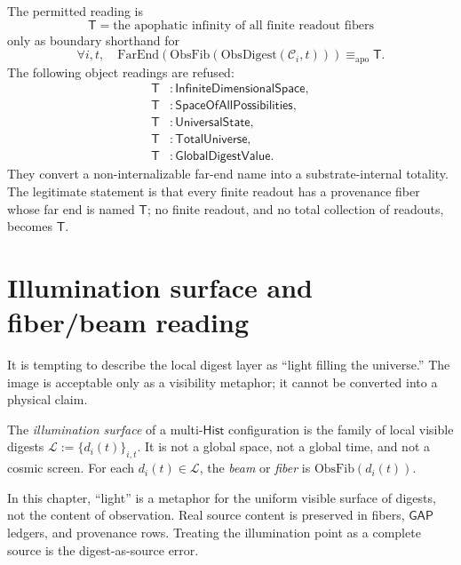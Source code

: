 \begin{principle}
\label{prin:hash-like-infinity-without-totality}
The permitted reading is
$$
\mathsf{T}=\text{the apophatic infinity of all finite readout fibers}
$$
only as boundary shorthand for
$$
\forall i,t,\quad
\mathrm{FarEnd}(\mathrm{ObsFib}(\mathrm{ObsDigest}(\mathcal{C}_i,t)))
\equiv_{\mathrm{apo}} \mathsf{T}.
$$
The following object readings are refused:
$$
\begin{aligned}
\mathsf{T} &: \mathsf{InfiniteDimensionalSpace},\\
\mathsf{T} &: \mathsf{SpaceOfAllPossibilities},\\
\mathsf{T} &: \mathsf{UniversalState},\\
\mathsf{T} &: \mathsf{TotalUniverse},\\
\mathsf{T} &: \mathsf{GlobalDigestValue}.
\end{aligned}
$$
They convert a non-internalizable far-end name into a substrate-internal totality. The legitimate statement is that every finite readout has a provenance fiber whose far end is named $\mathsf{T}$; no finite readout, and no total collection of readouts, becomes $\mathsf{T}$.
\end{principle}

\section{Illumination surface and fiber/beam reading}
\label{sec:hash-like-illumination-surface}

It is tempting to describe the local digest layer as ``light filling the universe.'' The image is acceptable only as a visibility metaphor; it cannot be converted into a physical claim.

\begin{definition}
\label{def:hash-like-illumination-surface}
The \emph{illumination surface} of a multi-$\mathsf{Hist}$ configuration is the family of local visible digests $\mathcal{L} := \{d_i(t)\}_{i,t}$. It is not a global space, not a global time, and not a cosmic screen. For each $d_i(t) \in \mathcal{L}$, the \emph{beam} or \emph{fiber} is $\mathrm{ObsFib}(d_i(t))$.
\end{definition}

\begin{principle}
\label{prin:hash-like-light-as-visibility}
In this chapter, ``light'' is a metaphor for the uniform visible surface of digests, not the content of observation. Real source content is preserved in fibers, $\mathsf{GAP}$ ledgers, and provenance rows. Treating the illumination point as a complete source is the digest-as-source error.
\end{principle}

